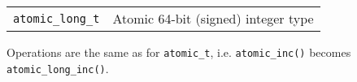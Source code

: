 
\begin{header}
\begin{tabularx}{\linewidth}{@{}lR@{}}
\texttt{atomic\_long\_t} & Atomic 64-bit (signed) integer type
\end{tabularx}

Operations are the same as for \texttt{atomic\_t}, i.e. \texttt{atomic\_inc()} becomes \texttt{atomic\_long\_inc()}.
\end{header}
